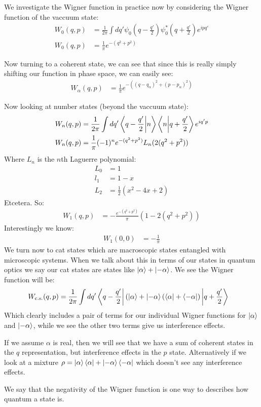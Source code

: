 We investigate the Wigner function in practice now by considering the Wigner function of the vaccuum state:
\begin{align*}
	W_0(q,p) &=\frac{1}{2\pi} \int dq' \psi_0\left(q- \frac{q'}{2}\right)\psi_0^*\left(q + \frac{q'}{2}\right) e^{ipq'} \\
	W_0(q,p) &=\frac{1}{\pi} e^{-(q^2 + p^2)}
\end{align*}

Now turning to a coherent state, we can see that since this is really simply shifting our function in phase space, we can easily see:
\begin{align*}
	W_\alpha(q,p) &= \frac{1}{\pi} e^{-((q-q_\alpha)^2 + (p-p_\alpha)^2)} 
\end{align*}

Now looking at number states (beyond the vaccuum state):
\begin{align*}
	W_n(q,p) &=\frac{1}{2\pi} \int dq' \bra{q - \frac{q'}{2}}\ket{n}\bra{n}\ket{q + \frac{q'}{2}} e^{iq'p} \\
	W_n(q,p) &= \frac{1}{\pi}(-1)^n e^{-(q^2 + p^2)}L_n(2(q^2 + p^2))
\end{align*}
Where $L_n$ is the $n$th Laguerre polynomial:
\begin{align*}
	L_0 &= 1 \\
	l_1 &= 1-x \\
	L_2 &= \frac{1}{2}(x^2 - 4x +2)
\end{align*}
Etcetera.
So:
\begin{align*}
	W_1(q,p) &= -\frac{e^{-(q^2 + p^2)}}{\pi} (1 - 2(q^2 + p^2))
\end{align*}
Interestingly we know:
\begin{align*}
	W_1(0,0) &= -\frac{1}{\pi}
\end{align*}
We turn now to cat states which are macroscopic states entangled with microscopic systems. When we talk about this in terms of our states in quantum optics we say our cat states are states like $\ket{\alpha} + \ket{-\alpha}$. We see the Wigner function will be:
\begin{align*}
	W_\text{c.s.}(q,p) &= \frac{1}{2\pi} \int dq'\bra{q - \frac{q'}{2}}(\ket{\alpha} + \ket{-\alpha}(\bra{\alpha} + \bra{-\alpha})\ket{q + \frac{q'}{2}} 
\end{align*}
Which clearly includes a pair of terms for our individual Wigner functions for $\ket{\alpha}$ and $\ket{-\alpha}$, while we see the other two terms give us interference effects.

If we assume $\alpha$ is real, then we will see that we have a sum of coherent states in the $q$ representation, but interference effects in the $p$ state. 
Alternatively if we look at a mixture $\rho = \ket{\alpha}\bra{\alpha} + \ket{-\alpha}\bra{-\alpha}$ which doesn't see any interference effects.

We say that the negativity of the Wigner function is one way to describes how quantum a state is.
